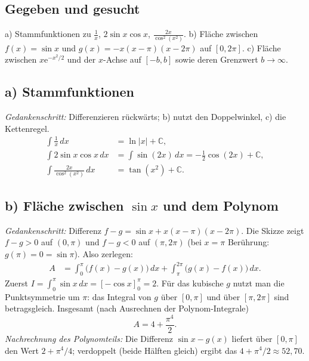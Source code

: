 
\subsection*{Gegeben und gesucht}
a) Stammfunktionen zu $\frac1x$, $2\sin x\cos x$, $\frac{2x}{\cos^2(x^2)}$.
b) Fläche zwischen $f(x)=\sin x$ und
$g(x)=-x(x-\pi)(x-2\pi)$ auf $[0,2\pi]$. c) Fläche zwischen
$x\mathrm e^{-x^2/2}$ und der $x$-Achse auf $[-b,b]$ sowie deren
Grenzwert $b\to\infty$.

\subsection*{a) Stammfunktionen}
\emph{Gedankenschritt:} Differenzieren rückwärts; b) nutzt den Doppelwinkel,
c) die Kettenregel.
\begin{align*}
  \int \frac1x\,dx&=\ln|x|+\mathbb C,\\
  \int 2\sin x\cos x\,dx&=\int\sin(2x)\,dx=-\tfrac12\cos(2x)+\mathbb C,\\
  \int \frac{2x}{\cos^2(x^2)}\,dx&=\tan(x^2)+\mathbb C .
\end{align*}

\subsection*{b) Fläche zwischen $\sin x$ und dem Polynom}
\emph{Gedankenschritt:} Differenz $f-g=\sin x+x(x-\pi)(x-2\pi)$. Die
Skizze zeigt $f-g>0$ auf $(0,\pi)$ und $f-g<0$ auf $(\pi,2\pi)$ (bei
$x=\pi$ Berührung: $g(\pi)=0=\sin\pi$). Also zerlegen:
\begin{align*}
  A&=\int_0^{\pi}\bigl(f(x)-g(x)\bigr)\,dx
    +\int_{\pi}^{2\pi}\bigl(g(x)-f(x)\bigr)\,dx .
\end{align*}
Zuerst $I=\int_0^\pi\sin x\,dx=[-\cos x]_0^\pi=2$. Für das kubische $g$
nutzt man die Punktsymmetrie um $\pi$: das Integral von $g$ über $[0,\pi]$
und über $[\pi,2\pi]$ sind betragsgleich. Insgesamt (nach Ausrechnen der
Polynom-Integrale)
\begin{equation*}
  A=4+\frac{\pi^4}{2}.
\end{equation*}
\emph{Nachrechnung des Polynomteils:} Die Differenz $\sin x-g(x)$ liefert
über $[0,\pi]$ den Wert $2+\pi^4/4$; verdoppelt (beide Hälften gleich)
ergibt das $4+\pi^4/2\approx52{,}70$.

